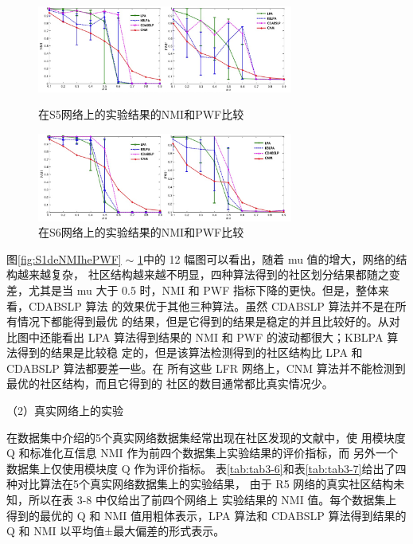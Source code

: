 \begin{figure}
  \centering
  \includegraphics[width=0.75\textwidth]{figures/S5deNMIhePWF}
  \caption{在S5网络上的实验结果的NMI和PWF比较}\label{fig:S5deNMIhePWF}

  \includegraphics[width=0.75\textwidth]{figures/S6deNMIhePWF}
  \caption{在S6网络上的实验结果的NMI和PWF比较}\label{fig:S6deNMIhePWF}
\end{figure}

图\ref{fig:S1deNMIhePWF} $\sim$ \ref{fig:S6deNMIhePWF}中的 12 幅图可以看出，随着 mu 值的增大，网络的结构越来越复杂，
社区结构越来越不明显，四种算法得到的社区划分结果都随之变差，尤其是当
mu 大于 0.5 时，NMI 和 PWF 指标下降的更快。但是，整体来看，CDABSLP 算法
的效果优于其他三种算法。虽然 CDABSLP 算法并不是在所有情况下都能得到最优
的结果，但是它得到的结果是稳定的并且比较好的。从对比图中还能看出 LPA
算法得到结果的 NMI 和 PWF 的波动都很大；KBLPA 算法得到的结果是比较稳
定的，但是该算法检测得到的社区结构比 LPA 和 CDABSLP 算法都要差一些。在
所有这些 LFR 网络上，CNM 算法并不能检测到最优的社区结构，而且它得到的
社区的数目通常都比真实情况少。 

（2）真实网络上的实验

在数据集中介绍的5个真实网络数据集经常出现在社区发现的文献中，使
用模块度 Q 和标准化互信息 NMI 作为前四个数据集上实验结果的评价指标，而
另外一个数据集上仅使用模块度 Q 作为评价指标。 
表\ref{tab:tab3-6}和表\ref{tab:tab3-7}给出了四种对比算法在5个真实网络数据集上的实验结果，
由于 R5 网络的真实社区结构未知，所以在表 3-8 中仅给出了前四个网络上
实验结果的 NMI 值。每个数据集上得到的最优的 Q 和 NMI 值用粗体表示，LPA
算法和 CDABSLP 算法得到结果的 Q 和 NMI 以平均值±最大偏差的形式表示。

